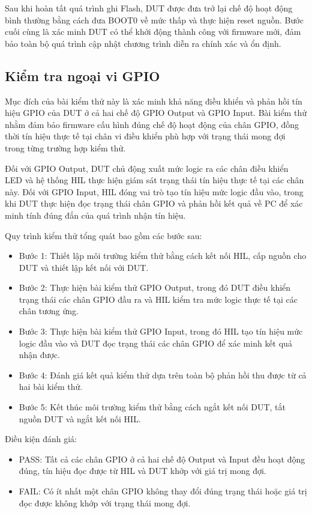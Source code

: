 Sau khi hoàn tất quá trình ghi Flash, DUT được đưa trở lại chế độ hoạt động bình thường bằng cách đưa BOOT0 về mức thấp và thực hiện reset nguồn. Bước cuối cùng là xác minh DUT có thể khởi động thành công với firmware mới, đảm bảo toàn bộ quá trình cập nhật chương trình diễn ra chính xác và ổn định.

\subsection{Kiểm tra ngoại vi GPIO}
Mục đích của bài kiểm thử này là xác minh khả năng điều khiển và phản hồi tín hiệu GPIO của DUT ở cả hai chế độ GPIO Output và GPIO Input. Bài kiểm thử nhằm đảm bảo firmware cấu hình đúng chế độ hoạt động của chân GPIO, đồng thời tín hiệu thực tế tại chân vi điều khiển phù hợp với trạng thái mong đợi trong từng trường hợp kiểm thử.

Đối với GPIO Output, DUT chủ động xuất mức logic ra các chân điều khiển LED và hệ thống HIL thực hiện giám sát trạng thái tín hiệu thực tế tại các chân này. Đối với GPIO Input, HIL đóng vai trò tạo tín hiệu mức logic đầu vào, trong khi DUT thực hiện đọc trạng thái chân GPIO và phản hồi kết quả về PC để xác minh tính đúng đắn của quá trình nhận tín hiệu.

Quy trình kiểm thử tổng quát bao gồm các bước sau:

\begin{itemize}
    \item Bước 1: Thiết lập môi trường kiểm thử bằng cách kết nối HIL, cấp nguồn cho DUT và thiết lập kết nối với DUT.
    \item Bước 2: Thực hiện bài kiểm thử GPIO Output, trong đó DUT điều khiển trạng thái các chân GPIO đầu ra và HIL kiểm tra mức logic thực tế tại các chân tương ứng.
    \item Bước 3: Thực hiện bài kiểm thử GPIO Input, trong đó HIL tạo tín hiệu mức logic đầu vào và DUT đọc trạng thái các chân GPIO để xác minh kết quả nhận được.
    \item Bước 4: Đánh giá kết quả kiểm thử dựa trên toàn bộ phản hồi thu được từ cả hai bài kiểm thử.
    \item Bước 5: Kết thúc môi trường kiểm thử bằng cách ngắt kết nối DUT, tắt nguồn DUT và ngắt kết nối HIL.
\end{itemize}

Điều kiện đánh giá:

\begin{itemize}
    \item PASS: Tất cả các chân GPIO ở cả hai chế độ Output và Input đều hoạt động đúng, tín hiệu đọc được từ HIL và DUT khớp với giá trị mong đợi.
    \item FAIL: Có ít nhất một chân GPIO không thay đổi đúng trạng thái hoặc giá trị đọc được không khớp với trạng thái mong đợi.
\end{itemize}

